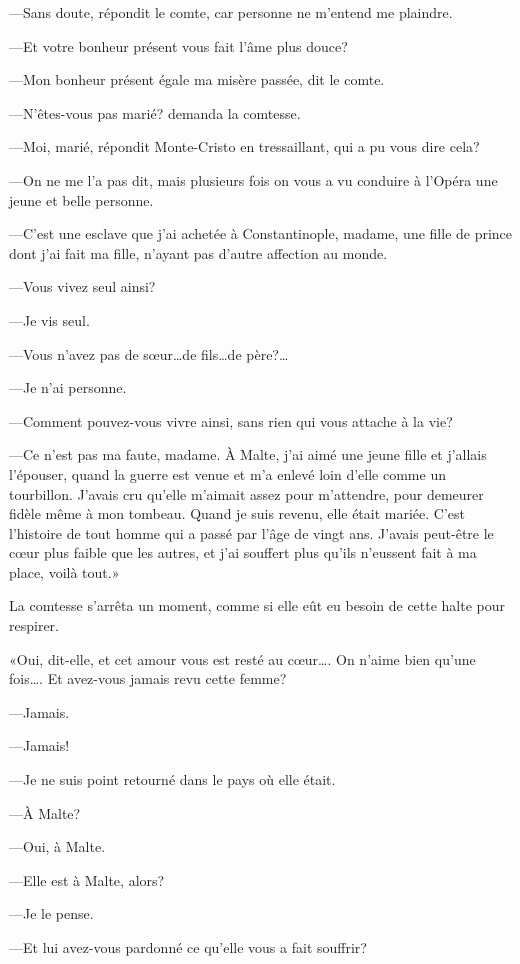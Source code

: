 —Sans doute, répondit le comte, car personne ne m'entend me plaindre. 

—Et votre bonheur présent vous fait l'âme plus douce? 

—Mon bonheur présent égale ma misère passée, dit le comte. 

—N'êtes-vous pas marié? demanda la comtesse. 

—Moi, marié, répondit Monte-Cristo en tressaillant, qui a pu vous dire cela? 

—On ne me l'a pas dit, mais plusieurs fois on vous a vu conduire à l'Opéra une jeune et belle personne. 

—C'est une esclave que j'ai achetée à Constantinople, madame, une fille de prince dont j'ai fait ma fille, n'ayant pas d'autre affection au monde. 

—Vous vivez seul ainsi? 

—Je vis seul. 

—Vous n'avez pas de sœur\dots de fils\dots de père?\dots 

—Je n'ai personne. 

—Comment pouvez-vous vivre ainsi, sans rien qui vous attache à la vie? 

—Ce n'est pas ma faute, madame. À Malte, j'ai aimé une jeune fille et j'allais l'épouser, quand la guerre est venue et m'a enlevé loin d'elle comme un tourbillon. J'avais cru qu'elle m'aimait assez pour m'attendre, pour demeurer fidèle même à mon tombeau. Quand je suis revenu, elle était mariée. C'est l'histoire de tout homme qui a passé par l'âge de vingt ans. J'avais peut-être le cœur plus faible que les autres, et j'ai souffert plus qu'ils n'eussent fait à ma place, voilà tout.» 

La comtesse s'arrêta un moment, comme si elle eût eu besoin de cette halte pour respirer. 

«Oui, dit-elle, et cet amour vous est resté au cœur\dots. On n'aime bien qu'une fois\dots. Et avez-vous jamais revu cette femme? 

—Jamais. 

—Jamais! 

—Je ne suis point retourné dans le pays où elle était. 

—À Malte? 

—Oui, à Malte. 

—Elle est à Malte, alors? 

—Je le pense. 

—Et lui avez-vous pardonné ce qu'elle vous a fait souffrir? 

